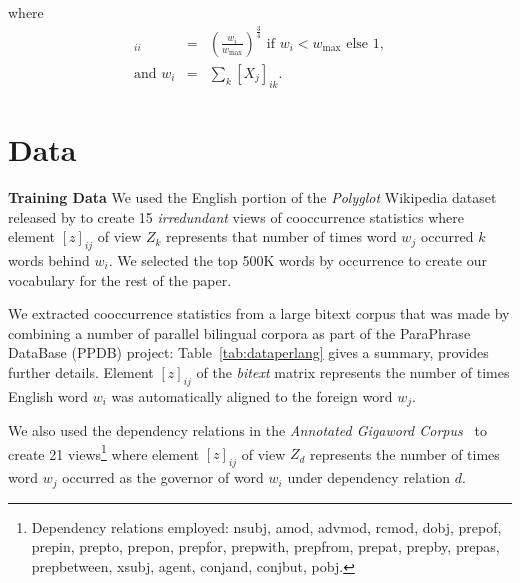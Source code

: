 \documentclass[11pt]{article}
\newcommand{\xline}[0]{\noindent\underline{\makebox[0.1cm][l]{}}}
\newcommand{\remove}[1]{}
\begin{document}
where
\begin{eqnarray}
[W_j]_{ii} &=& \left(\frac{w_i}{w_{\max}}\right)^{\frac{3}{4}} \text{ if } w_i <
  w_{\max} \text{ else } 1, \nonumber \\
  \text{and } w_i &=&  \sum_k [X_j]_{ik}. \nonumber
\end{eqnarray}


\section{Data}
\label{sec:data}

\noindent\textbf{Training Data} We used the English portion of the
\textit{Polyglot} Wikipedia dataset released by
 to create 15 \emph{irredundant} views of
cooccurrence statistics where element $[z]_{ij}$ of view $Z_k$
represents that number of times word $w_j$ occurred $k$ words behind
$w_i$. We selected the top 500K words by occurrence to create our
vocabulary for the rest of the paper.


We extracted cooccurrence statistics from a large bitext corpus that
was made by combining a number of parallel bilingual corpora as part
of the ParaPhrase DataBase (PPDB) project: Table~\ref{tab:dataperlang}
gives a summary,  provides further
details. Element $[z]_{ij}$ of the \textit{bitext} matrix represents
the number of times English word $w_i$ was automatically aligned to
the foreign word $w_j$.

We also used the dependency relations in the \textit{Annotated
  Gigaword Corpus}~\cite{annotatedGigaword12} to create 21
views\footnote{Dependency relations employed: nsubj, amod, advmod, rcmod, dobj, prep\xline{}of,
  prep\xline{}in, prep\xline{}to, prep\xline{}on, prep\xline{}for,
  prep\xline{}with, prep\xline{}from, prep\xline{}at, prep\xline{}by,
  prep\xline{}as, prep\xline{}between, xsubj, agent, conj\xline{}and,
  conj\xline{}but, pobj.}  where element $[z]_{ij}$ of view
$Z_d$ represents the number of times word $w_j$ occurred
as the governor of word $w_i$ under dependency relation $d$.

\end{document}
